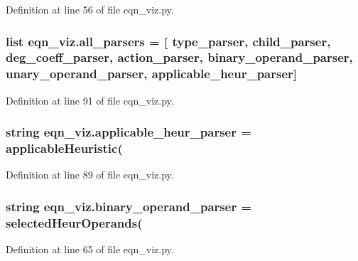 Definition at line 56 of file eqn\+\_\+viz.\+py.

\hypertarget{namespaceeqn__viz_a7be3eddfb6de11856410a9b26fc4a701}{}
\subsubsection[{all\+\_\+parsers}]{\setlength{\rightskip}{0pt plus 5cm}list eqn\+\_\+viz.\+all\+\_\+parsers = \mbox{[} {\bf type\+\_\+parser}, {\bf child\+\_\+parser}, {\bf deg\+\_\+coeff\+\_\+parser}, {\bf action\+\_\+parser}, {\bf binary\+\_\+operand\+\_\+parser}, {\bf unary\+\_\+operand\+\_\+parser}, {\bf applicable\+\_\+heur\+\_\+parser}\mbox{]}}\label{namespaceeqn__viz_a7be3eddfb6de11856410a9b26fc4a701}


Definition at line 91 of file eqn\+\_\+viz.\+py.

\hypertarget{namespaceeqn__viz_adb85cfac07b72248b7de0626b8e31bff}{}
\subsubsection[{applicable\+\_\+heur\+\_\+parser}]{\setlength{\rightskip}{0pt plus 5cm}string eqn\+\_\+viz.\+applicable\+\_\+heur\+\_\+parser = \textquotesingle{}applicable\+Heuristic(\textquotesingle{}}\label{namespaceeqn__viz_adb85cfac07b72248b7de0626b8e31bff}


Definition at line 89 of file eqn\+\_\+viz.\+py.

\hypertarget{namespaceeqn__viz_a7a7eda2f6b22edf43034366ee5b0e433}{}
\subsubsection[{binary\+\_\+operand\+\_\+parser}]{\setlength{\rightskip}{0pt plus 5cm}string eqn\+\_\+viz.\+binary\+\_\+operand\+\_\+parser = \textquotesingle{}selected\+Heur\+Operands(\textquotesingle{}}\label{namespaceeqn__viz_a7a7eda2f6b22edf43034366ee5b0e433}


Definition at line 65 of file eqn\+\_\+viz.\+py.

